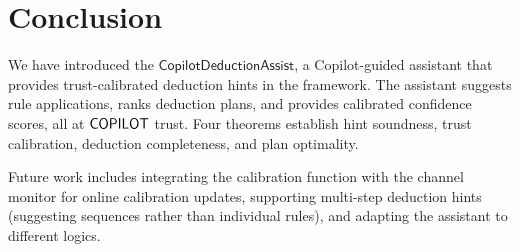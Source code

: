 \documentclass[11pt]{article}
\newcommand{\CDA}{\mathsf{CopilotDeductionAssist}}
\begin{document}
\section{Conclusion}\label{sec:conclusion}

We have introduced the $\CDA$, a Copilot-guided assistant
that provides trust-calibrated deduction hints in the
\JuGeo{} framework.  The assistant suggests rule applications,
ranks deduction plans, and provides calibrated confidence
scores, all at $\mathsf{COPILOT}$ trust.  Four theorems establish
hint soundness, trust calibration, deduction completeness,
and plan optimality.

Future work includes integrating the calibration function
with the channel monitor for online calibration updates,
supporting multi-step deduction hints (suggesting sequences
rather than individual rules), and adapting the assistant
to different logics.
\end{document}
